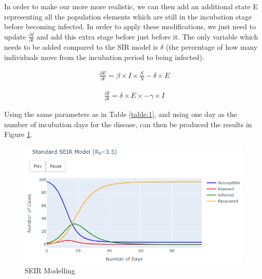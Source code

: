 In order to make our more more realistic, we can then add an additional state E representing all the population elements which are still in the incubation stage before becoming infected. In order to apply these modifications, we just need to update $\frac{\partial I}{\partial t}$ and add this extra stage before just before it. The only variable which needs to be added compared to the SIR model is $\delta$ (the percentage of how many individuals move from the incubation period to being infected).

\useshortskip
\begin{align}
\ \frac{\partial E}{\partial t} = \beta \times I \times \frac{S}{N} -\delta \times E
\end{align}
\useshortskip

\useshortskip
\begin{align}
\ \frac{\partial I}{\partial t} = \delta \times E \times -\gamma \times I
\end{align}
\useshortskip

Using the same parameters as in Table \ref{table:1}, and using one day as the number of incubation days for the disease, can then be produced the results in Figure \ref{seir}.

\begin{figure}[ht!]%
    \centering
    \includegraphics[width=13cm]{latex/images/seir.PNG}%
    \caption{SEIR Modelling}
    \label{seir}
\end{figure}

